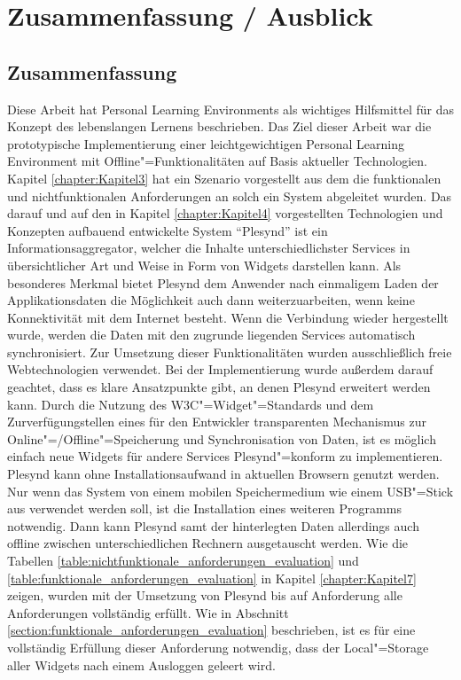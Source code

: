 \chapter{Zusammenfassung / Ausblick} 
\label{chapter:Kapitel8}

\section{Zusammenfassung}
Diese Arbeit hat Personal Learning Environments als wichtiges Hilfsmittel für das Konzept des lebenslangen Lernens beschrieben. Das Ziel dieser Arbeit war die prototypische Implementierung einer leichtgewichtigen Personal Learning Environment mit Offline"=Funktionalitäten auf Basis aktueller Technologien. Kapitel \ref{chapter:Kapitel3} hat ein Szenario vorgestellt aus dem die funktionalen und nichtfunktionalen Anforderungen an solch ein System abgeleitet wurden. Das darauf und auf den in Kapitel \ref{chapter:Kapitel4} vorgestellten Technologien und Konzepten aufbauend entwickelte System "`Plesynd"' ist ein Informationsaggregator, welcher die Inhalte unterschiedlichster Services in übersichtlicher Art und Weise in Form von Widgets darstellen kann. Als besonderes Merkmal bietet Plesynd dem Anwender nach einmaligem Laden der Applikationsdaten die Möglichkeit auch dann weiterzuarbeiten, wenn keine Konnektivität mit dem Internet besteht. Wenn die Verbindung wieder hergestellt wurde, werden die Daten mit den zugrunde liegenden Services automatisch synchronisiert. Zur Umsetzung dieser Funktionalitäten wurden ausschließlich freie Webtechnologien verwendet. Bei der Implementierung wurde außerdem darauf geachtet, dass es klare Ansatzpunkte gibt, an denen Plesynd erweitert werden kann. Durch die Nutzung des W3C"=Widget"=Standards und dem Zurverfügungstellen eines für den Entwickler transparenten Mechanismus zur Online"=/Offline"=Speicherung und Synchronisation von Daten, ist es möglich einfach neue Widgets für andere Services Plesynd"=konform zu implementieren. Plesynd kann ohne Installationsaufwand in aktuellen Browsern genutzt werden. Nur wenn das System von einem mobilen Speichermedium wie einem USB"=Stick aus verwendet werden soll, ist die Installation eines weiteren Programms notwendig. Dann kann Plesynd samt der hinterlegten Daten allerdings auch offline zwischen unterschiedlichen Rechnern ausgetauscht werden.  Wie die Tabellen \ref{table:nichtfunktionale_anforderungen_evaluation} und \ref{table:funktionale_anforderungen_evaluation} in Kapitel \ref{chapter:Kapitel7} zeigen, wurden mit der Umsetzung von Plesynd bis auf Anforderung  alle Anforderungen vollständig erfüllt. Wie in Abschnitt \ref{section:funktionale_anforderungen_evaluation} beschrieben, ist es für eine vollständig Erfüllung dieser Anforderung notwendig, dass der Local"=Storage aller Widgets nach einem Ausloggen geleert wird. 

